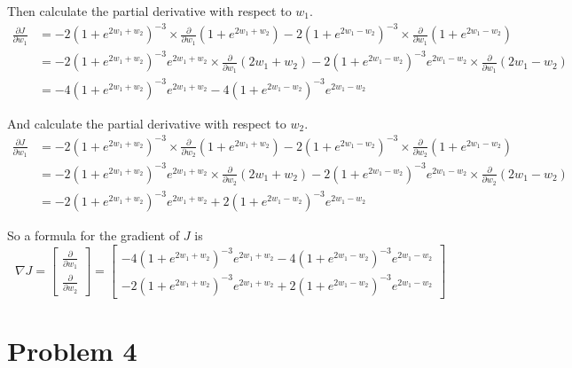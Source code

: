 \documentclass[11pt]{article}
\begin{document}
Then calculate the partial derivative with respect to $w_1$.
\begin{equation}
    \begin{split}
        \frac{\partial J}{\partial w_1} 
        &= -2 (1+e^{2w_1+w_2})^{-3} \times \frac{\partial}{\partial w_1} (1+e^{2w_1+w_2}) - 2 (1+e^{2w_1-w_2})^{-3} \times \frac{\partial}{\partial w_1} (1+e^{2w_1-w_2}) \\
        &= -2 (1+e^{2w_1+w_2})^{-3} e^{2w_1+w_2} \times \frac{\partial}{\partial w_1} (2w_1+w_2) - 2(1+e^{2w_1-w_2})^{-3} e^{2w_1-w_2} \times \frac{\partial}{\partial w_1} (2w_1-w_2) \\
        &= -4 (1+e^{2w_1+w_2})^{-3} e^{2w_1+w_2} - 4(1+e^{2w_1-w_2})^{-3} e^{2w_1-w_2}
    \end{split}
\end{equation}

And calculate the partial derivative with respect to $w_2$.
\begin{equation}
    \begin{split}
        \frac{\partial J}{\partial w_1} 
        &= -2 (1+e^{2w_1+w_2})^{-3} \times \frac{\partial}{\partial w_2} (1+e^{2w_1+w_2}) - 2 (1+e^{2w_1-w_2})^{-3} \times \frac{\partial}{\partial w_2} (1+e^{2w_1-w_2}) \\
        &= -2 (1+e^{2w_1+w_2})^{-3} e^{2w_1+w_2} \times \frac{\partial}{\partial w_2} (2w_1+w_2) - 2(1+e^{2w_1-w_2})^{-3} e^{2w_1-w_2} \times \frac{\partial}{\partial w_2} (2w_1-w_2) \\
        &= -2 (1+e^{2w_1+w_2})^{-3} e^{2w_1+w_2} + 2(1+e^{2w_1-w_2})^{-3} e^{2w_1-w_2}
    \end{split}
\end{equation}

So a formula for the gradient of $J$ is
\begin{equation}
    \nabla J =
    \begin{bmatrix}
        \frac{\partial}{\partial w_1} \\
        \frac{\partial}{\partial w_2}
    \end{bmatrix} =
    \begin{bmatrix}
        -4 (1+e^{2w_1+w_2})^{-3} e^{2w_1+w_2} - 4(1+e^{2w_1-w_2})^{-3} e^{2w_1-w_2} \\ -2 (1+e^{2w_1+w_2})^{-3} e^{2w_1+w_2} + 2(1+e^{2w_1-w_2})^{-3} e^{2w_1-w_2}
    \end{bmatrix}
\end{equation}

\newpage
\section*{Problem 4}
\end{document}
